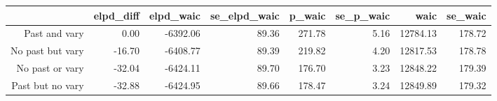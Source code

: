 \begin{table}[ht]
\centering
\begin{tabular}{rrrrrrrr}
  \hline
 & elpd\_diff & elpd\_waic & se\_elpd\_waic & p\_waic & se\_p\_waic & waic & se\_waic \\ 
  \hline
Past and vary & 0.00 & -6392.06 & 89.36 & 271.78 & 5.16 & 12784.13 & 178.72 \\ 
  No past but vary & -16.70 & -6408.77 & 89.39 & 219.82 & 4.20 & 12817.53 & 178.78 \\ 
  No past or vary & -32.04 & -6424.11 & 89.70 & 176.70 & 3.23 & 12848.22 & 179.39 \\ 
  Past but no vary & -32.88 & -6424.95 & 89.66 & 178.47 & 3.24 & 12849.89 & 179.32 \\ 
   \hline
\end{tabular}
\end{table}
